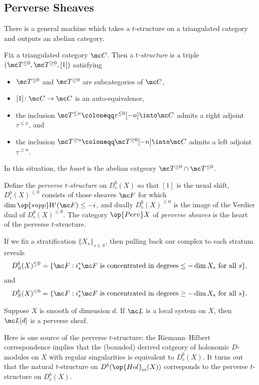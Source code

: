 \documentclass{article}
\begin{document}
\subsection{Perverse Sheaves}
There is a general machine which takes a $t$-structure on a triangulated category and outputs an abelian category.
\begin{definition}[$t$-structure]
	Fix a triangulated category $\mc C$. Then a \textit{$t$-structure} is a triple $(\mc T^{\le0},\mc T^{\ge0},[1])$ satisfying
	\begin{itemize}
		\item $\mc T^{\le0}$ and $\mc T^{\ge0}$ are subcategories of $\mc C$,
		\item $[1]\colon\mc C\to\mc C$ is an auto-equivalence,
		\item the inclusion $\mc T^{\le n}\coloneqq\tau^{\le0}[-n]\into\mc C$ admits a right adjoint $\tau^{\le n}$, and
		\item the inclusion $\mc T^{\ge n}\coloneqq\mc T^{\ge0}[-n]\into\mc C$ admits a left adjoint $\tau^{\ge n}$.
	\end{itemize}
	In this situation, the \textit{heart} is the abelian catgeory $\mc T^{\ge0}\cap\mc T^{\le0}$.
\end{definition}
\begin{definition}
	Define the \textit{perverse $t$-structure} on $D^b_c(X)$ so that $[1]$ is the usual shift, $D^b_c(X)^{\le0}$ consists of those sheaves $\mc F$ for which $\dim\op{supp}\mathrm H^i(\mc F)\le-i$, and dually $D_c^b(X)^{\ge0}$ is the image of the Verdier dual of $D_c^b(X)^{\le0}$. The category $\op{Perv}X$ of \textit{perverse sheaves} is the heart of the perverse $t$-structure.
\end{definition}
\begin{remark}
	If we fix a stratification $\{X_s\}_{s\in S}$, then pulling back our complex to each stratum reveals
	\[D^b_S(X)^{\le0}=\{\mc F:i_s^*\mc F\text{ is concentrated in degrees}\le-\dim X_s\text{ for all }s\},\]
	and
	\[D^b_S(X)^{\le0}=\{\mc F:i_s^*\mc F\text{ is concentrated in degrees}\ge-\dim X_s\text{ for all }s\}.\]
\end{remark}
\begin{example}
	Suppose $X$ is smooth of dimension $d$. If $\mc L$ is a local system on $X$, then $\mc L[d]$ is a perverse sheaf.
\end{example}
\begin{remark}
	Here is one source of the perverse $t$-structure: the Riemann--Hilbert correspondence implies that the (bounded) derived catgeory of holonomic $D$-modules on $X$ with regular singularities is equivalent to $D^b_c(X)$. It turns out that the natural $t$-structure on $D^b(\op{Hol}_{\mathrm{rs}}(X))$ corresponds to the perverse $t$-structure on $D^b_c(X)$.
\end{remark}
\end{document}
